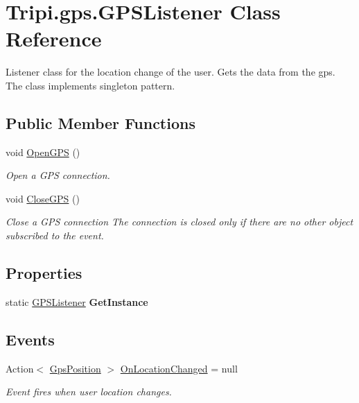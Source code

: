 \hypertarget{class_tripi_1_1gps_1_1_g_p_s_listener}{
\section{Tripi.gps.GPSListener Class Reference}
\label{class_tripi_1_1gps_1_1_g_p_s_listener}
}


Listener class for the location change of the user. Gets the data from the gps. The class implements singleton pattern.  
\subsection*{Public Member Functions}
\begin{DoxyCompactItemize}
\item 
void \hyperlink{class_tripi_1_1gps_1_1_g_p_s_listener_a4ff986081e6623190ae285cd80ca162e}{OpenGPS} ()
\begin{DoxyCompactList}\small\item\em Open a GPS connection. \item\end{DoxyCompactList}\item 
void \hyperlink{class_tripi_1_1gps_1_1_g_p_s_listener_a311460b7b647b6dc41bea72902554e78}{CloseGPS} ()
\begin{DoxyCompactList}\small\item\em Close a GPS connection The connection is closed only if there are no other object subscribed to the event. \item\end{DoxyCompactList}\end{DoxyCompactItemize}
\subsection*{Properties}
\begin{DoxyCompactItemize}
\item 
\hypertarget{class_tripi_1_1gps_1_1_g_p_s_listener_adb5e00692fc27631912f2da7c6957740}{
static \hyperlink{class_tripi_1_1gps_1_1_g_p_s_listener}{GPSListener} {\bfseries GetInstance}}
\label{class_tripi_1_1gps_1_1_g_p_s_listener_adb5e00692fc27631912f2da7c6957740}

\end{DoxyCompactItemize}
\subsection*{Events}
\begin{DoxyCompactItemize}
\item 
Action$<$ \hyperlink{class_g_p_s_mobile_1_1_gps_position}{GpsPosition} $>$ \hyperlink{class_tripi_1_1gps_1_1_g_p_s_listener_ad18f501e60df1dad6c880c9638463139}{OnLocationChanged} = null
\begin{DoxyCompactList}\small\item\em Event fires when user location changes. \item\end{DoxyCompactList}\end{DoxyCompactItemize}


